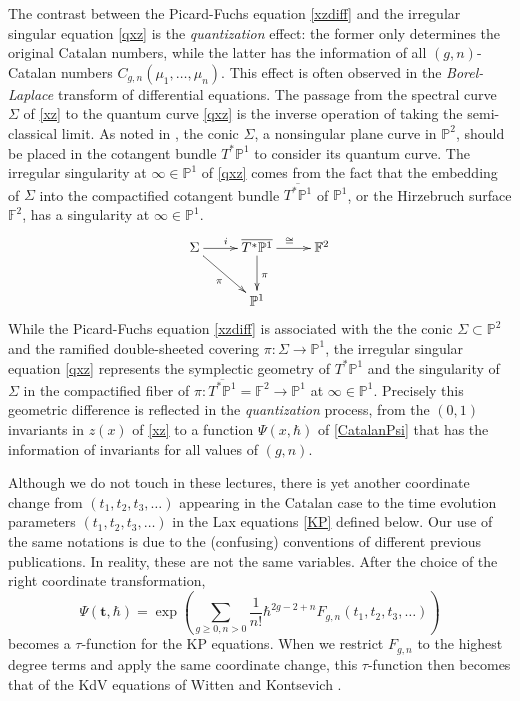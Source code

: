 \documentclass{amsart}
\theoremstyle{definition}
\numberwithin{equation}{section}
\numberwithin{figure}{section}
\def\isom{\cong}
\newcommand{\bP}{{\mathbb{P}}}
\newcommand{\bF}{{\mathbb{F}}}
\newcommand{\lrar}{\longrightarrow}
\begin{document}
The contrast between the Picard-Fuchs equation \eqref{xzdiff} and
the irregular singular equation \eqref{qxz} is the \emph{quantization}
effect: the former only determines the original Catalan numbers, while the latter
has the information of all $(g,n)$-Catalan numbers $C_{g,n}(\mu_1,\dots,\mu_n)$. This effect is often 
observed in the \emph{Borel-Laplace} transform of 
differential equations. 
The passage from the spectral curve $\Sigma$ of \eqref{xz} to the quantum curve
\eqref{qxz} is the inverse operation of taking the {semi-classical limit}. 
As noted 
in \cite{OM2}, the conic $\Sigma$, a nonsingular plane
curve in $\bP^2$,  should be placed in the cotangent bundle $T^*\bP^1$
to consider its quantum curve.
The irregular singularity at $\infty\in\bP^1$ of \eqref{qxz}
comes from the fact that the embedding of $\Sigma$ into the compactified
cotangent bundle  $\overline{T^*\bP^1}$ of $\bP^1$, 
or the Hirzebruch surface $\bF^2$, has a singularity
at $\infty\in\bP^1$.
\begin{equation}
\label{spectral}
\xymatrix{
\Sigma \ar[dr]_{\pi}\ar[r]^{i} 
&{\overline{T^*\bP^1}}\ar[d]^{\pi}\ar[r]^\isom&\bF^2
\\
&\bP^1	}
\end{equation} 
While the Picard-Fuchs equation \eqref{xzdiff} is associated with the
the conic $\Sigma\subset \bP^2$ and the
ramified double-sheeted covering  $\pi: \Sigma \lrar \bP^1$,
 the irregular singular equation \eqref{qxz}
represents the symplectic geometry of $T^*\bP^1$ and the singularity of
$\Sigma$ in the compactified fiber of $\pi: \overline{T^*\bP^1}=\bF^2 \lrar \bP^1$
at $\infty\in\bP^1$. Precisely this geometric difference is reflected in the
\emph{quantization} process, from the $(0,1)$ invariants
in $z(x)$ of \eqref{xz} to a function $\Psi(x,\hbar)$ 
of \eqref{CatalanPsi} that has the information of invariants for all 
values of $(g,n)$.

Although we do not touch in these lectures, there is yet another coordinate
change from $(t_1,t_2,t_3,\dots)$ appearing in the Catalan case to the
time evolution parameters $(t_1,t_2,t_3,\dots)$  in 
the Lax equations \eqref{KP} defined below. 
Our use of the  same notations is due to the (confusing) conventions 
of different previous publications.  In reality,
these are not the same variables. After the choice of  the
right  coordinate transformation, 
\begin{equation}
\label{Catalantau}
\Psi(\mathbf{t},\hbar)=
\exp\left(
\sum_{g\ge 0, n>0}\frac{1}{n!}\hbar^{2g-2+n}
F_{g,n}(t_1,t_2,t_3,\dots)
\right)
\end{equation}
becomes a $\tau$-function for the KP equations. When we restrict
$F_{g,n}$ to the highest degree terms and apply the same 
coordinate change, this $\tau$-function then becomes that of the
KdV equations of Witten \cite{W1991} and Kontsevich \cite{K1992}.
\end{document}
